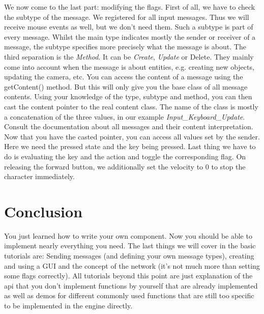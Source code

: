 \documentclass{article}
\begin{document}
We now come to the last part: modifying the flags. First of all, we have to check the subtype of the message. We registered for all input messages. Thus we will receive mouse events as well, but we don't need them. Such a subtype is part of every message. Whilst the main type indicates mostly the sender or receiver of a message, the subtype specifies more precisely what the message is about. The third separation is the \textit{Method}. It can be \textit{Create}, \textit{Update} or {Delete}. They mainly come into account when the message is about entities, e.g. creating new objects, updating the camera, etc. You can access the content of a message using the getContent() method. But this will only give you the base class of all message contents. Using your knowledge of the type, subtype and method, you can then cast the content pointer to the real content class. The name of the class is mostly a concatenation of the three values, in our example \textit{Input_Keyboard_Update}. Consult the documentation about all messages and their content interpretation. Now that you have the casted pointer, you can access all values set by the sender. Here we need the pressed state and the key being pressed. Last thing we have to do is evaluating the key and the action and toggle the corresponding flag. On releasing the forward button, we additionally set the velocity to 0 to stop the character immediately.


\section{Conclusion}

You just learned how to write your own component. Now you should be able to implement nearly everything you need. The last things we will cover in the basic tutorials are: Sending messages (and defining your own message types), creating and using a GUI and the concept of the network (it's not much more than setting some flags correctly). All tutorials beyond this point are just explanation of the api that you don't implement functions by yourself that are already implemented as well as demos for different commonly used functions that are still too specific to be implemented in the engine directly.
\end{document}
